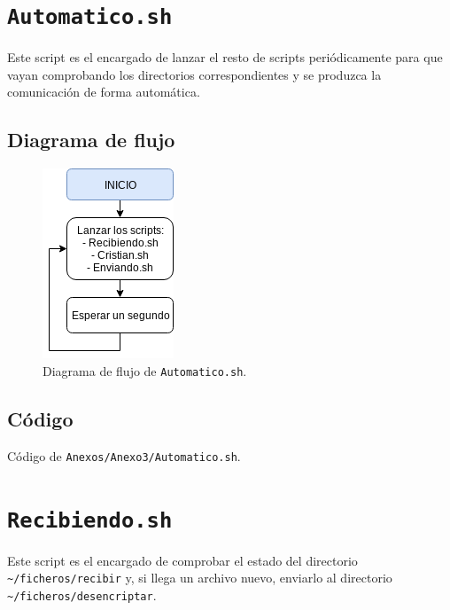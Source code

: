 \newpage
\section{\texttt{Automatico.sh}}
\hypertarget{ScriptAutomatico}{}
Este script es el encargado de lanzar el resto de scripts periódicamente para que vayan comprobando los directorios correspondientes y se produzca la comunicación de forma automática.

\subsection{Diagrama de flujo}
\begin{figure}[h]
	\centering
	\includegraphics[scale=0.9]{Anexos/Anexo3/Diagramas/Automatico.png}
	\caption{Diagrama de flujo de \texttt{Automatico.sh}.}
	\label{Diagrama de flujo de Automatico.sh}
\end{figure}

\subsection{Código}

\begin{center}
	Código de \texttt{Anexos/Anexo3/Automatico.sh}.
\end{center}


\newpage
\section{\texttt{Recibiendo.sh}}
\hypertarget{ScriptRecibiendo}{}
Este script es el encargado de comprobar el estado del directorio \texttt{\textasciitilde/ficheros/recibir} y, si llega un archivo nuevo, enviarlo al directorio \texttt{\textasciitilde/ficheros/desencriptar}.

